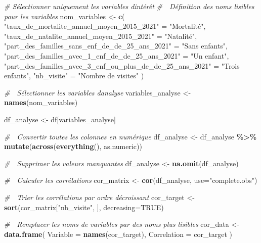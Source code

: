 \documentclass[
]{article}
\newenvironment{Shaded}{\begin{snugshade}}{\end{snugshade}}
\newcommand{\AttributeTok}[1]{\textcolor[rgb]{0.13,0.29,0.53}{#1}}
\newcommand{\CommentTok}[1]{\textcolor[rgb]{0.56,0.35,0.01}{\textit{#1}}}
\newcommand{\ConstantTok}[1]{\textcolor[rgb]{0.56,0.35,0.01}{#1}}
\newcommand{\FunctionTok}[1]{\textcolor[rgb]{0.13,0.29,0.53}{\textbf{#1}}}
\newcommand{\NormalTok}[1]{#1}
\newcommand{\OtherTok}[1]{\textcolor[rgb]{0.56,0.35,0.01}{#1}}
\newcommand{\SpecialCharTok}[1]{\textcolor[rgb]{0.81,0.36,0.00}{\textbf{#1}}}
\newcommand{\StringTok}[1]{\textcolor[rgb]{0.31,0.60,0.02}{#1}}
\begin{document}
\begin{Shaded}
\begin{Highlighting}[]
\CommentTok{\# Sélectionner uniquement les variables d\textquotesingle{}intérêt}
\CommentTok{\# 📌 Définition des noms lisibles pour les variables}
\NormalTok{nom\_variables }\OtherTok{\textless{}{-}} \FunctionTok{c}\NormalTok{(}
  \StringTok{"taux\_de\_mortalite\_annuel\_moyen\_2015\_2021"} \OtherTok{=} \StringTok{"Mortalité"}\NormalTok{,}
  \StringTok{"taux\_de\_natalite\_annuel\_moyen\_2015\_2021"} \OtherTok{=} \StringTok{"Natalité"}\NormalTok{,}
  \StringTok{"part\_des\_familles\_sans\_enf\_de\_de\_25\_ans\_2021"} \OtherTok{=} \StringTok{"Sans enfants"}\NormalTok{,}
  \StringTok{"part\_des\_familles\_avec\_1\_enf\_de\_de\_25\_ans\_2021"} \OtherTok{=} \StringTok{"Un enfant"}\NormalTok{,}
  \StringTok{"part\_des\_familles\_avec\_3\_enf\_ou\_plus\_de\_de\_25\_ans\_2021"} \OtherTok{=} \StringTok{"Trois enfants"}\NormalTok{,}
  \StringTok{"nb\_visite"} \OtherTok{=} \StringTok{"Nombre de visites"}
\NormalTok{)}

\CommentTok{\# 📌 Sélectionner les variables d\textquotesingle{}analyse}
\NormalTok{variables\_analyse }\OtherTok{\textless{}{-}} \FunctionTok{names}\NormalTok{(nom\_variables)}

\NormalTok{df\_analyse }\OtherTok{\textless{}{-}}\NormalTok{ df[variables\_analyse]}

\CommentTok{\# 📌 Convertir toutes les colonnes en numérique}
\NormalTok{df\_analyse }\OtherTok{\textless{}{-}}\NormalTok{ df\_analyse }\SpecialCharTok{\%\textgreater{}\%} \FunctionTok{mutate}\NormalTok{(}\FunctionTok{across}\NormalTok{(}\FunctionTok{everything}\NormalTok{(), as.numeric))}

\CommentTok{\# 📌 Supprimer les valeurs manquantes}
\NormalTok{df\_analyse }\OtherTok{\textless{}{-}} \FunctionTok{na.omit}\NormalTok{(df\_analyse)  }

\CommentTok{\# 📌 Calculer les corrélations}
\NormalTok{cor\_matrix }\OtherTok{\textless{}{-}} \FunctionTok{cor}\NormalTok{(df\_analyse, }\AttributeTok{use=}\StringTok{"complete.obs"}\NormalTok{)}

\CommentTok{\# 📌 Trier les corrélations par ordre décroissant}
\NormalTok{cor\_target }\OtherTok{\textless{}{-}} \FunctionTok{sort}\NormalTok{(cor\_matrix[}\StringTok{"nb\_visite"}\NormalTok{, ], }\AttributeTok{decreasing=}\ConstantTok{TRUE}\NormalTok{)}

\CommentTok{\# 📌 Remplacer les noms de variables par des noms plus lisibles}
\NormalTok{cor\_data }\OtherTok{\textless{}{-}} \FunctionTok{data.frame}\NormalTok{(}
  \AttributeTok{Variable =} \FunctionTok{names}\NormalTok{(cor\_target),}
  \AttributeTok{Correlation =}\NormalTok{ cor\_target}
\NormalTok{)}


\end{Highlighting}
\end{Shaded}
\end{document}
